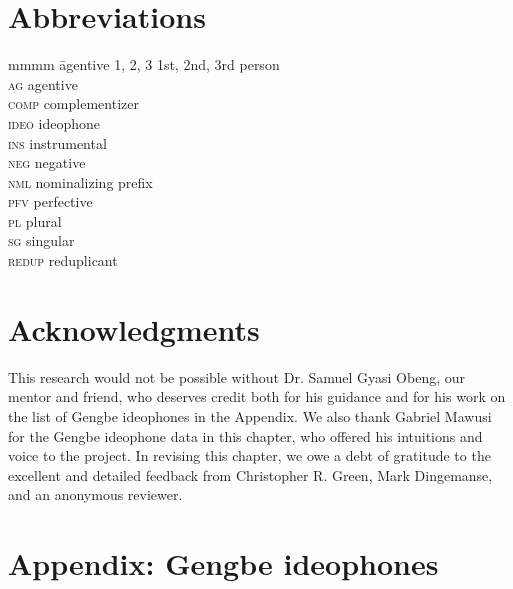 \documentclass[output=paper,colorlinks,citecolor=brown]{langscibook}
\begin{document}
\section*{Abbreviations}
\begin{multicols}{2}
\begin{tabbing}
mmmm \= agentive\kill
\textsc{1, 2, 3} \> 1st, 2nd, 3rd person \\
\textsc{ag} \> agentive\\
\textsc{comp} \> complementizer \\
\textsc{ideo} \> ideophone\\
\textsc{ins} \> instrumental \\
\textsc{neg} \> negative\\
\textsc{nml} \> nominalizing prefix\\
\textsc{pfv} \> perfective\\
\textsc{pl} \> plural \\
\textsc{sg} \> singular\\ 
\textsc{redup} \> reduplicant 
\end{tabbing}
\end{multicols}

\section*{Acknowledgments}

This research would not be possible without Dr. Samuel Gyasi Obeng, our mentor and friend, who deserves credit both for his guidance and for his work on the list of Gengbe ideophones in the Appendix. We also thank Gabriel Mawusi for the Gengbe ideophone data in this chapter, who offered his intuitions and voice to the project. In revising this chapter, we owe a debt of gratitude to the excellent and detailed feedback from Christopher R. Green, Mark Dingemanse, and an anonymous reviewer.

\section*{Appendix: Gengbe ideophones}
\end{document}
